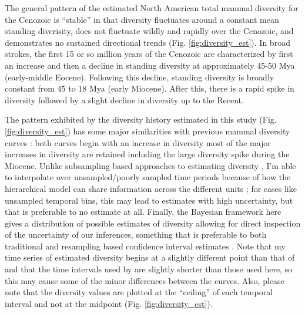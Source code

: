 \documentclass[12pt,letterpaper]{article}
\begin{document}
The general pattern of the estimated North American total mammal diversity for the Cenozoic is ``stable'' in that diversity fluctuates around a constant mean standing diverisity, does not fluctuate wildly and rapidly over the Cenozoic, and demonstrates no sustained directional trends (Fig. \ref{fig:diversity_est}). In broad strokes, the first 15 or so million years of the Cenozoic are characterized by first an increase and then a decline in standing diversity at approximately 45-50 Mya (early-middle Eocene). Following this decline, standing diversity is broadly constant from 45 to 18 Mya (early Miocene). After this, there is a rapid spike in diversity followed by a slight decline in diversity up to the Recent. 

The pattern exhibited by the diversity history estimated in this study (Fig. \ref{fig:diversity_est}) has some major similarities with previous mammal diversity curves \citep{Alroy2009}: both curves begin with an increase in diversity most of the major increases in diversity are retained including the large diversity spike during the Miocene. Unlike subsampling based approaches to estimating diversity \citep{Alroy2010c}, I'm able to interpolate over unsampled/poorly sampled time periods because of how the hierarchical model can share information across the different units \cite{Gelman2013d}; for cases like unsampled temporal bins, this may lead to estimates with high uncertainty, but that is preferable to no estimate at all. Finally, the Bayesian framework here gives a distribution of possible estimates of diversity allowing for direct inspection of the uncertainty of our inferences, something that is preferable to both traditional and resampling based confidence interval estimates \citep{Gelman2013d}. Note that my time series of estimated diversity begins at a slightly different point than that of \citet{Alroy2009} and that the time intervals used by \citet{Alroy2009} are slightly shorter than those used here, so this may cause some of the minor differences between the curves. Also, please note that the diversity values are plotted at the ``ceiling'' of each temporal interval and not at the midpoint (Fig. \ref{fig:diversity_est}).
\end{document}
